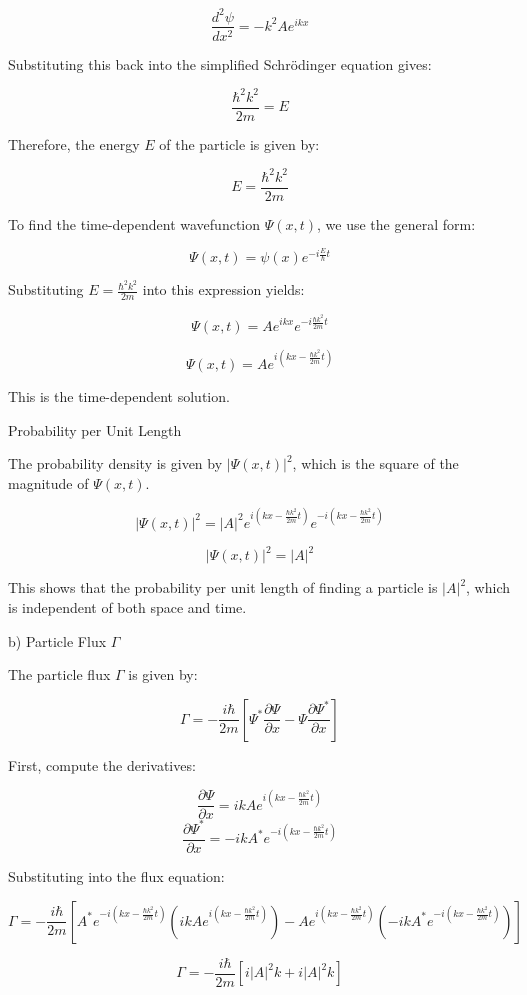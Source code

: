\[ \frac{d^2\psi}{dx^2} = -k^2Ae^{ikx} \]

Substituting this back into the simplified Schrödinger equation gives:

\[ \frac{\hbar^2k^2}{2m} = E \]

Therefore, the energy \( E \) of the particle is given by:

\[ E = \frac{\hbar^2k^2}{2m} \]

To find the time-dependent wavefunction \( \Psi(x,t) \), we use the general form:

\[ \Psi(x,t) = \psi(x)e^{-i\frac{E}{\hbar}t} \]

Substituting \( E = \frac{\hbar^2k^2}{2m} \) into this expression yields:

\[ \Psi(x,t) = Ae^{ikx}e^{-i\frac{\hbar k^2}{2m}t} \]

\[ \Psi(x,t) = Ae^{i(kx - \frac{\hbar k^2}{2m}t)} \]

This is the time-dependent solution.

Probability per Unit Length

The probability density is given by \( |\Psi(x,t)|^2 \), which is the square of the magnitude of \( \Psi(x,t) \).

\[ |\Psi(x,t)|^2 = |A|^2e^{i(kx - \frac{\hbar k^2}{2m}t)}e^{-i(kx - \frac{\hbar k^2}{2m}t)} \]

\[ |\Psi(x,t)|^2 = |A|^2 \]

This shows that the probability per unit length of finding a particle is \( |A|^2 \), which is independent of both space and time.

b) Particle Flux \( \Gamma \)

The particle flux \( \Gamma \) is given by:

\[ \Gamma = -\frac{i\hbar}{2m}\left[ \Psi^{*}\frac{\partial\Psi}{\partial x} - \Psi\frac{\partial\Psi^{*}}{\partial x} \right] \]

First, compute the derivatives:

\[ \frac{\partial\Psi}{\partial x} = ikAe^{i(kx - \frac{\hbar k^2}{2m}t)} \]
\[ \frac{\partial\Psi^{*}}{\partial x} = -ikA^{*}e^{-i(kx - \frac{\hbar k^2}{2m}t)} \]

Substituting into the flux equation:

\[ \Gamma = -\frac{i\hbar}{2m}\left[ A^{*}e^{-i(kx - \frac{\hbar k^2}{2m}t)}(ikAe^{i(kx - \frac{\hbar k^2}{2m}t)}) - Ae^{i(kx - \frac{\hbar k^2}{2m}t)}(-ikA^{*}e^{-i(kx - \frac{\hbar k^2}{2m}t)}) \right] \]

\[ \Gamma = -\frac{i\hbar}{2m}\left[ i|A|^2k + i|A|^2k \right] \]

